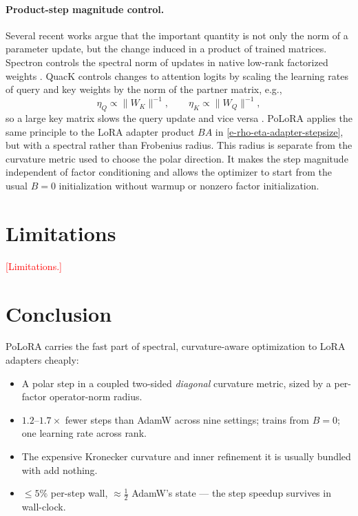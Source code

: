 \documentclass[11pt]{article}
\newcommand{\methodname}{PoLoRA\xspace}
\newcommand{\PLACEHOLDER}[1]{\textcolor{red}{[#1]}}
\theoremstyle{plain}
\theoremstyle{definition}
\theoremstyle{remark}
\begin{document}
\paragraph{Product-step magnitude control.}
Several recent works argue that the important quantity is not only the
norm of a parameter update, but the change induced in a product of
trained matrices.  Spectron controls the spectral norm of updates in
native low-rank factorized weights \cite{spectron}.  QuacK controls
changes to attention logits by scaling the learning rates of query and
key weights by the norm of the partner matrix, e.g.,
\[
    \eta_Q\propto \|W_K\|^{-1},
    \qquad
    \eta_K\propto \|W_Q\|^{-1},
\]
so a large key matrix slows the query update and vice versa
\cite{quack}.  \methodname{} applies the same principle to the LoRA
adapter product $BA$ in \eqref{e-rho-eta-adapter-stepsize}, but with a spectral rather than Frobenius radius.
This radius is separate from the curvature metric used to choose the
polar direction.  It makes the step magnitude independent of factor
conditioning and allows the optimizer to start from the usual $B=0$
initialization without warmup or nonzero factor initialization.


\section{Limitations}
\label{sec:limitations}
\PLACEHOLDER{Limitations.}

\section{Conclusion}
\label{sec:conclusion}
\methodname{} carries the fast part of spectral, curvature-aware optimization to
LoRA adapters cheaply:
\begin{itemize}[leftmargin=1.5em,itemsep=2pt,topsep=2pt]
  \item A polar step in a coupled two-sided \emph{diagonal} curvature metric, sized by a per-factor operator-norm radius.
  \item $1.2$--$1.7\times$ fewer steps than AdamW across nine settings; trains from $B{=}0$; one learning rate across rank.
  \item The expensive Kronecker curvature and inner refinement it is usually bundled with add nothing.
  \item $\le 5\%$ per-step wall, ${\approx}\tfrac12$ AdamW's state --- the step speedup survives in wall-clock.
\end{itemize}
\end{document}
